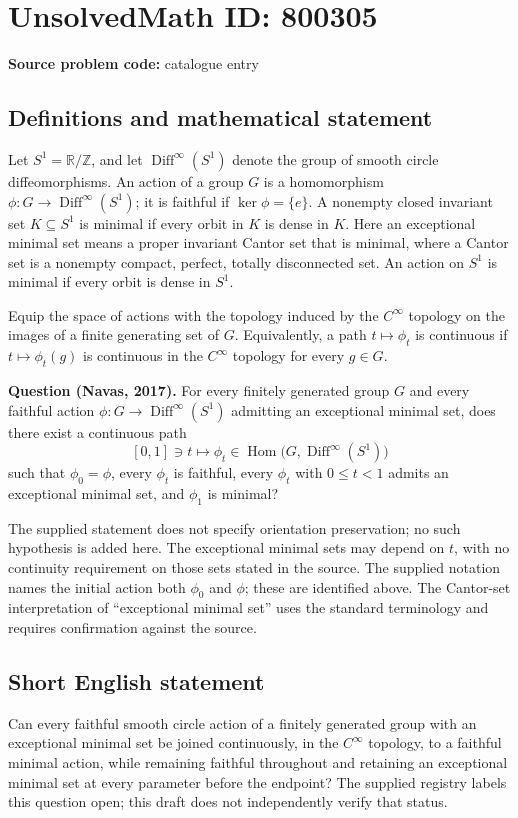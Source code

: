 \documentclass[11pt]{article}
\newcommand{\Z}{\mathbb{Z}}
\newcommand{\R}{\mathbb{R}}
\begin{document}
\section*{UnsolvedMath ID: 800305}
\textbf{Source problem code:} catalogue entry
\subsection{Definitions and mathematical statement}
Let \(S^1=\R/\Z\), and let \(\operatorname{Diff}^{\infty}(S^1)\) denote the group of smooth circle diffeomorphisms. An action of a group \(G\) is a homomorphism \(\phi:G\to\operatorname{Diff}^{\infty}(S^1)\); it is faithful if \(\ker\phi=\{e\}\). A nonempty closed invariant set \(K\subseteq S^1\) is minimal if every orbit in \(K\) is dense in \(K\). Here an exceptional minimal set means a proper invariant Cantor set that is minimal, where a Cantor set is a nonempty compact, perfect, totally disconnected set. An action on \(S^1\) is minimal if every orbit is dense in \(S^1\).

Equip the space of actions with the topology induced by the \(C^{\infty}\) topology on the images of a finite generating set of \(G\). Equivalently, a path \(t\mapsto\phi_t\) is continuous if \(t\mapsto\phi_t(g)\) is continuous in the \(C^{\infty}\) topology for every \(g\in G\).

\textbf{Question (Navas, 2017).} For every finitely generated group \(G\) and every faithful action \(\phi:G\to\operatorname{Diff}^{\infty}(S^1)\) admitting an exceptional minimal set, does there exist a continuous path
\[
[0,1]\ni t\longmapsto\phi_t\in\operatorname{Hom}\bigl(G,\operatorname{Diff}^{\infty}(S^1)\bigr)
\]
such that \(\phi_0=\phi\), every \(\phi_t\) is faithful, every \(\phi_t\) with \(0\leq t<1\) admits an exceptional minimal set, and \(\phi_1\) is minimal?

The supplied statement does not specify orientation preservation; no such hypothesis is added here. The exceptional minimal sets may depend on \(t\), with no continuity requirement on those sets stated in the source. The supplied notation names the initial action both \(\phi_0\) and \(\phi\); these are identified above. The Cantor-set interpretation of ``exceptional minimal set'' uses the standard terminology and requires confirmation against the source.
\subsection{Short English statement}
Can every faithful smooth circle action of a finitely generated group with an exceptional minimal set be joined continuously, in the \(C^{\infty}\) topology, to a faithful minimal action, while remaining faithful throughout and retaining an exceptional minimal set at every parameter before the endpoint? The supplied registry labels this question open; this draft does not independently verify that status.
\end{document}
